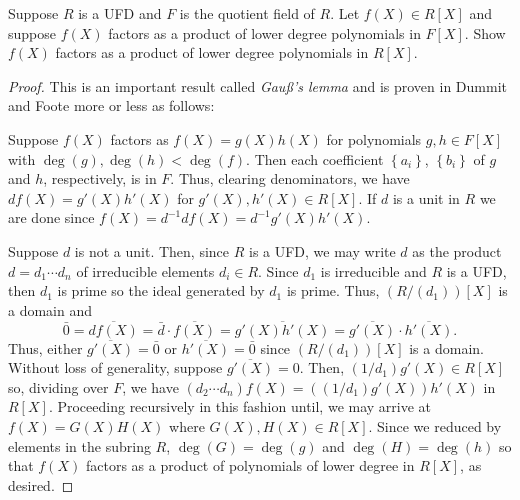 \begin{problem}
Suppose $R$ is a UFD and $F$ is the quotient field of $R$. Let $f(X)\in
R[X]$ and suppose $f(X)$ factors as a product of lower degree polynomials
in $F[X]$. Show $f(X)$ factors as a product of lower degree polynomials in
$R[X]$.
\end{problem}
\begin{proof}
This is an important result called \emph{Gauß's lemma} and is proven in
Dummit and Foote more or less as follows:

Suppose $f(X)$ factors as $f(X)=g(X)h(X)$ for polynomials $g,h\in F[X]$
with $\deg(g),\deg(h)<\deg(f)$. Then each coefficient $\left\{a_i\right\}$,
$\left\{b_i\right\}$ of $g$ and $h$, respectively, is in $F$. Thus,
clearing denominators, we have $df(X)=g'(X)h'(X)$ for $g'(X),h'(X)\in
R[X]$. If $d$ is a unit in $R$ we are done since
$f(X)=d^{-1}df(X)=d^{-1}g'(X)h'(X)$.

Suppose $d$ is not a unit. Then, since $R$ is a UFD, we may write $d$ as
the product $d=d_1\cdots d_n$ of irreducible elements $d_i\in R$. Since
$d_1$ is irreducible and $R$ is a UFD, then $d_1$ is prime so the ideal
generated by $d_1$ is prime. Thus, $\left(R/(d_1)\right)[X]$ is a domain
and
\[
\bar 0=\overline{df(X)}=
{\bar d}\cdot \overline{f(X)}=\overline{g'(X)h'(X)}=
\overline{g'(X)}\cdot\overline{h'(X)}.
\]
Thus, either $\overline{g'(X)}=\bar 0$ or $\overline{h'(X)}=\bar 0$ since
$\left(R/(d_1)\right)[X]$ is a domain. Without loss of generality, suppose
$\overline{g'(X)}=0$. Then, $(1/d_1)g'(X)\in R[X]$ so, dividing over
$F$, we have $(d_2\cdots d_n)f(X)=\left((1/d_1)g'(X)\right)h'(X)$ in
$R[X]$. Proceeding recursively in this fashion until, we may arrive at
$f(X)=G(X)H(X)$ where $G(X),H(X)\in R[X]$. Since we reduced by elements in
the subring $R$, $\deg(G)=\deg(g)$ and $\deg(H)=\deg(h)$ so that $f(X)$
factors as a product of polynomials of lower degree in $R[X]$, as desired.
\end{proof}

